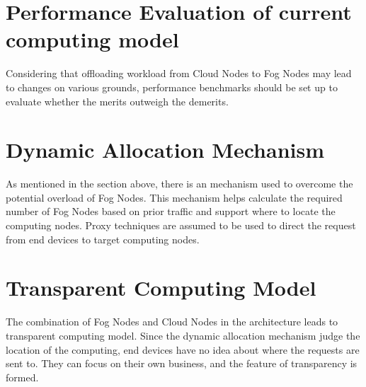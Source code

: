 \section{Performance Evaluation of current computing model}
Considering that offloading workload from Cloud Nodes to Fog Nodes may lead to changes on various grounds, performance benchmarks should be set up to evaluate whether the merits outweigh the demerits.

\section{Dynamic Allocation Mechanism}
As mentioned in the section above, there is an mechanism used to overcome the potential overload of Fog Nodes. This mechanism helps calculate the required number of Fog Nodes based on prior traffic and support where to locate the computing nodes. Proxy techniques are assumed to be used to direct the request from end devices to target computing nodes.

\section{Transparent Computing Model}
The combination of Fog Nodes and Cloud Nodes in the architecture leads to transparent computing model. Since the dynamic allocation mechanism judge the location of the computing, end devices have no idea about where the requests are sent to. They can focus on their own business, and the feature of transparency is formed.